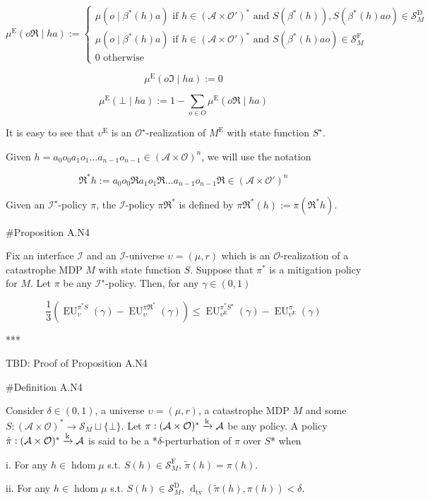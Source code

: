 \documentclass[a4paper]{article}
\newcommand{\AP}[1]{\left(#1\right)}
\newcommand{\Dtva}[1]{\operatorname{d}_{\text{tv}}\AP{#1}}
\newcommand{\M}{\xrightarrow{\textnormal{k}}}
\newcommand{\Ob}{\mathcal{O}}
\newcommand{\A}{\mathcal{A}}
\newcommand{\St}{\mathcal{S}}
\newcommand{\In}{\mathcal{I}}
\newcommand{\FH}{(\A \times \Ob)^*}
\DeclareMathOperator{\HD}{hdom}
\newcommand{\RMD}{\mathrm{D}}
\newcommand{\RME}{\mathrm{E}}
\newcommand{\RMF}{\mathrm{F}}
\newcommand{\SF}{\St^{\RMF}}
\newcommand{\SD}{\St^{\RMD}}
\newcommand{\ME}{M^{\RME}}
\newcommand{\EU}{\operatorname{EU}}
\begin{document}
$$\mu^\RME(o\Re \mid ha) := \begin{cases} \mu\AP{o \mid \beta^*(h)a} \text{ if } h\in\AP{\A \times \Ob'}^* \text{ and } S\AP{\beta^*(h)},S\AP{\beta^*(h)ao}\in\SD_M \\ \mu\AP{o \mid \beta^*(h)a} \text{ if } h\in\AP{\A \times \Ob'}^* \text{ and } S\AP{\beta^*(h)ao}\in\SF_M \\ 0 \text{ otherwise} \end{cases}$$

$$\mu^\RME(o\Im \mid ha) := 0$$

$$\mu^\RME(\bot \mid ha) := 1 - \sum_{o \in O} \mu^\RME(o\Re \mid ha)$$

It is easy to see that $\upsilon^\RME$ is an $\Ob^\star$-realization of $\ME$ with state function $S^\star$.

Given $h = a_0 o_0 a_1 o_1 \ldots a_{n-1} o_{n-1} \in \AP{\A \times \Ob}^n$, we will use the notation

$$\Re^*h := a_0 o_0 \Re a_1 o_1 \Re \ldots a_{n-1} o_{n-1} \Re \in \AP{\A \times \Ob'}^n$$ 

Given an $\In^\star$-policy $\pi$, the $\In$-policy $\pi\Re^*$ is defined by $\pi\Re^*(h) := \pi\AP{\Re^*h}$.

\#Proposition A.N4

Fix an interface $\In$ and an $\In$-universe $\upsilon=(\mu,r)$ which is an $\Ob$-realization of a catastrophe MDP $M$ with state function $S$. Suppose that $\pi^*$ is a mitigation policy for $M$. Let $\pi$ be any $\In^\star$-policy. Then, for any $\gamma\in(0,1)$

$$\frac{1}{3}\AP{\EU_{\upsilon}^{\pi^* S}(\gamma)-\EU_{\upsilon}^{\pi\Re^*}(\gamma)} \leq \EU_{\upsilon^\RME}^{\pi^* S^\star}(\gamma)-\EU_{\upsilon^\RME}^{\pi}(\gamma)$$

***

TBD: Proof of Proposition A.N4

\#Definition A.N4

Consider $\delta\in(0,1)$, a universe $\upsilon=(\mu,r)$, a catastrophe MDP $M$ and some $S: \FH \rightarrow \St_M \sqcup \{\bot\}$. Let $\pi: \FH \M \A$ be any policy. A policy $\tilde{\pi}: \FH \M \A$ is said to be a *$\delta$-perturbation of $\pi$ over $S$* when

i. For any $h \in \HD{\mu}$ s.t. $S(h)\in\SF_M$, $\tilde{\pi}(h)=\pi(h)$.

ii. For any $h \in \HD{\mu}$ s.t. $S(h)\in\SD_M$, $\Dtva{\tilde{\pi}(h),\pi(h)} < \delta$.

\end{document}
